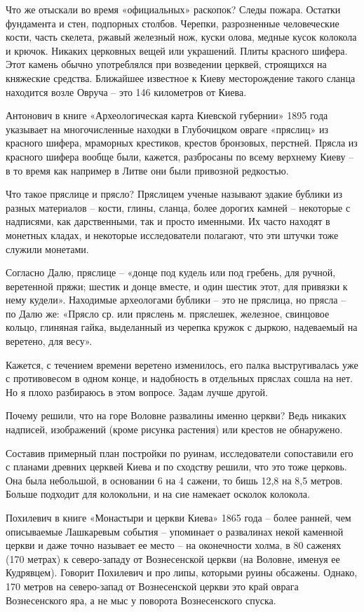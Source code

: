 Что же отыскали во время «официальных» раскопок? Следы пожара. Остатки фундамента и стен, подпорных столбов. Черепки, разрозненные человеческие кости, часть скелета, ржавый железный нож, куски олова, медные кусок колокола и крючок. Никаких церковных вещей или украшений. Плиты красного шифера. Этот камень обычно употреблялся при возведении церквей, строящихся на княжеские средства. Ближайшее известное к Киеву месторождение такого сланца находится возле Овруча – это 146 километров от Киева.

Антонович в книге «Археологическая карта Киевской губернии» 1895 года указывает на многочисленные находки в Глубочицком овраге «пряслиц» из красного шифера, мраморных крестиков, крестов бронзовых, перстней. Прясла из красного шифера вообще были, кажется, разбросаны по всему верхнему Киеву – в то время как например в Литве они были привозной редкостью.

Что такое пряслице и прясло? Пряслицем ученые называют эдакие бублики из разных материалов – кости, глины, сланца, более дорогих камней – некоторые с надписями, как дарственными, так и просто именными. Их часто находят в монетных кладах, и некоторые исследователи полагают, что эти штучки тоже служили монетами. 

Согласно Далю, пряслице – «донце под кудель или под гребень, для ручной, веретенной пряжи; шестик и донце вместе, и один шестик этот, для привязки к нему кудели». Находимые археологами бублики – это не пряслица, но прясла – по Далю же: «Прясло ср. или пряслень м. пряслешек, железное, свинцовое кольцо, глиняная гайка, выделанный из черепка кружок с дыркою, надеваемый на веретено, для весу».

Кажется, с течением времени веретено изменилось, его палка выстругивалась уже с противовесом в одном конце, и надобность в отдельных пряслах сошла на нет. Но я плохо разбираюсь в этом вопросе. Задам лучше другой.
 
Почему решили, что на горе Воловне развалины именно церкви? Ведь никаких надписей, изображений (кроме рисунка растения) или крестов не обнаружено.

Составив примерный план постройки по руинам, исследователи сопоставили его с планами древних церквей Киева и по сходству решили, что это тоже церковь. Она была небольшой, в основании 6 на 4 сажени, то бишь 12,8 на 8,5 метров. Больше подходит для колокольни, и на сие намекает осколок колокола.

Похилевич в книге «Монастыри и церкви Киева»\cite{pohilmon} 1865 года – более ранней, чем описываемые Лашкаревым события – упоминает о развалинах некой каменной церкви и даже точно называет ее место – на оконечности холма, в 80 саженях (170 метрах) к северо-западу от Вознесенской церкви (на Воловне, именуя ее Кудрявцем). Говорит Похилевич и про липы, которыми руины обсажены. Однако, 170 метров на северо-запад от Вознесенской церкви это край оврага Вознесенского яра, а не мыс у поворота Вознесенского спуска. 

